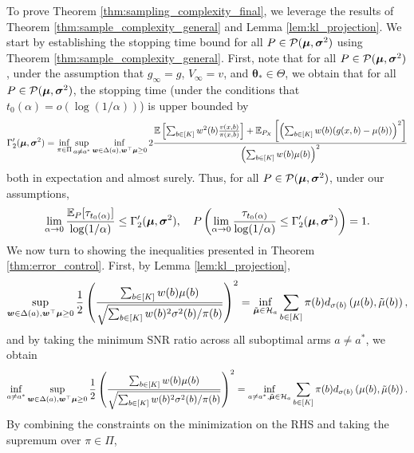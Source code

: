 \documentclass{article}
\begin{document}
\begin{appendices}
To prove Theorem \ref{thm:sampling_complexity_final}, we leverage the results of Theorem \ref{thm:sample_complexity_general} and Lemma \ref{lem:kl_projection}. We start by establishing the stopping time bound for all $P \in \mathcal{P}(\boldsymbol{\mu}, \boldsymbol{\sigma}^2)$ using Theorem \ref{thm:sample_complexity_general}. First, note that for all $P \in \mathcal{P}(\boldsymbol{\mu}, \boldsymbol{\sigma}^2)$, under the assumption that $g_\infty=g$, $V_\infty = v$, and $\bm{\theta}_* \in \Theta$, we obtain that for all $P \in \mathcal{P}(\boldsymbol{\mu}, \boldsymbol{\sigma}^2)$, the stopping time (under the conditions that $t_0(\alpha) = o(\log(1/\alpha))$) is upper bounded by
\begin{equation}
    \Gamma_2'(\boldsymbol\mu, \boldsymbol\sigma^2) = \inf_{\pi \in \Pi}\sup_{a \neq a^*} \inf_{\boldsymbol{w} \in \Delta(a), \boldsymbol{w}^\top \boldsymbol\mu \geq 0}  2\frac{\mathbb{E}\left[\sum_{b \in [K]}w^2(b) \frac{v(x,b)}{\pi(x,b)}\right] + \mathbb{E}_{P_X}\left[\left(\sum_{b \in [K]} w(b) (g(x,b) - \mu(b))\right)^2\right]}{\left( \sum_{b \in [K]} w(b) \mu(b) \right)^2}
\end{equation}
both in expectation and almost surely. Thus, for all $P \in \mathcal{P}(\boldsymbol\mu, \boldsymbol\sigma^2)$, under our assumptions, 
\begin{equation}
    \lim_{\alpha \rightarrow 0}\frac{\mathbb{E}_P[\tau_{t_0(\alpha)}]}{\log(1/\alpha)} \leq \Gamma_2'(\boldsymbol\mu, \boldsymbol\sigma^2), \quad P\left(\lim_{\alpha \rightarrow 0} \frac{\tau_{t_0(\alpha)}}{\log(1/\alpha)} \leq \Gamma_2'(\boldsymbol\mu, \boldsymbol\sigma^2)\right) = 1.
\end{equation}
We now turn to showing the inequalities presented in Theorem \ref{thm:error_control}. First, by Lemma \ref{lem:kl_projection},
\begin{equation}
    \sup_{\boldsymbol{w} \in \Delta(a), \boldsymbol{w}^\top \boldsymbol{\mu}\geq 0}\frac{1}{2}\left( \frac{\sum_{b \in [K]}w(b) \mu(b)}{\sqrt{\sum_{b \in [K]} w(b)^2\sigma^2(b)/\pi(b)}}\right)^2 = \inf_{\tilde{\boldsymbol{\mu}} \in \mathcal{H}_a} \sum_{b \in [K]}\pi(b)  d_{\sigma(b)}\left(\mu(b), \tilde{\mu}(b)\right),
\end{equation}
and by taking the minimum SNR ratio across all suboptimal arms $a \neq a^*$, we obtain
\begin{equation}
    \inf_{a \neq a^*}\sup_{\boldsymbol{w} \in \Delta(a), \boldsymbol{w}^\top \boldsymbol{\mu}\geq 0}\frac{1}{2}\left( \frac{\sum_{b \in [K]}w(b) \mu(b)}{\sqrt{\sum_{b \in [K]} w(b)^2\sigma^2(b)/\pi(b)}}\right)^2 = \inf_{a \neq a^*, \tilde{\boldsymbol\mu} \in \mathcal{H}_a} \sum_{b \in [K]}\pi(b)  d_{\sigma(b)}\left(\mu(b), \tilde{\mu}(b)\right).
\end{equation}
By combining the constraints on the minimization on the RHS and taking the supremum over $\pi \in \Pi$,

\end{appendices}
\end{document}
